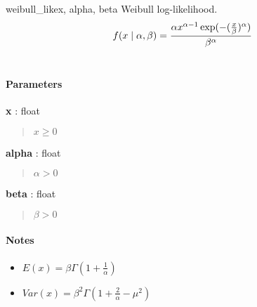 \hypertarget{pymc.distributions.weibull_like}{}
\begin{funcdesc}{weibull\_like}{x, alpha, beta}
Weibull log-likelihood.
\begin{gather}
\begin{split}f(x \mid \alpha, \beta) = \frac{\alpha x^{\alpha - 1}
\exp(-(\frac{x}{\beta})^{\alpha})}{\beta^\alpha}\end{split}\notag\\\begin{split}\end{split}\notag
\end{gather}\paragraph{Parameters}\begin{paramlist}

\item[] \textbf{x} : float
\begin{quote}

$x \ge 0$
\end{quote}

\item[] \textbf{alpha} : float
\begin{quote}

$\alpha>0$
\end{quote}

\item[] \textbf{beta} : float
\begin{quote}

$\beta>0$
\end{quote}
\end{paramlist}
\paragraph{Notes}
\begin{itemize}
\item {}
$E(x)=\beta \Gamma(1+\frac{1}{\alpha})$

\item {}
$Var(x)=\beta^2 \Gamma(1+\frac{2}{\alpha} - \mu^2)$

\end{itemize}
\end{funcdesc}

